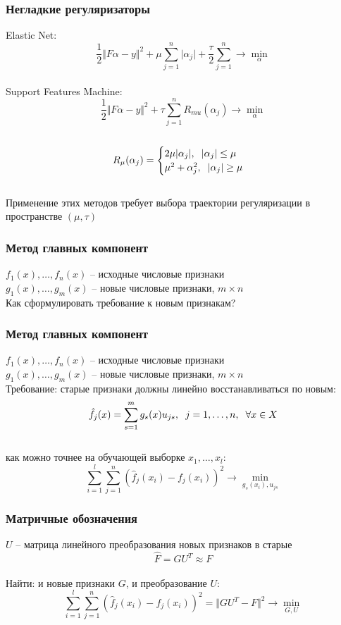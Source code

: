 \documentclass[12pt]{beamer}
\begin{document}
\begin{frame}\frametitle{Негладкие регуляризаторы}
Elastic Net:\\
$$\frac{1}{2} \Vert F\alpha - y \Vert^2 + \mu \sum\limits_{j=1}^n \vert \alpha_j \vert + \frac{\tau}{2} \sum\limits_{j=1}^n \rightarrow \min\limits_{\alpha}$$\\
Support Features Machine:\\
$$\frac{1}{2} \Vert F\alpha - y \Vert^2 + \tau \sum\limits_{j=1}^n R_{mu}(\alpha_j) \rightarrow \min\limits_{\alpha}$$\\
$$ R_{\mu}(\alpha_j) = \begin{cases} 2 \mu \vert \alpha_j \vert, \hspace{2mm} \vert \alpha_j \vert \leq \mu\\
\mu^2 + \alpha_j^2, \hspace{2mm} \vert \alpha_j \vert \geq \mu
\end{cases}$$\\
Применение этих методов требует выбора траектории регуляризации в пространстве $(\mu, \tau )$
\end{frame}

\begin{frame}\frametitle{Метод главных компонент}
$f_1(x), \dots, f_n(x)$ -- исходные числовые признаки\\
$g_1(x), \dots, g_m(x)$ -- новые числовые признаки, $m \times n$\\
Как сформулировать требование к новым признакам?
\end{frame}


\begin{frame}\frametitle{Метод главных компонент}
$f_1(x), \dots, f_n(x)$ -- исходные числовые признаки\\
$g_1(x), \dots, g_m(x)$ -- новые числовые признаки, $m \times n$\\
Требование: старые признаки должны линейно
восстанавливаться по новым:\\
$$\hat{f}_j(x) = \sum\limits_{s=1}^m g_s(x) u_{js} , \hspace{2mm} j = 1,\dots , n, \hspace{2mm} \forall x \in X$$\\
как можно точнее на обучающей выборке $x_1, \dots, x_l$:\\
$$\sum\limits_{i=1}^l \sum\limits_{j=1}^n (\hat{f}_j(x_i) - f_j(x_i))^2 \rightarrow \min\limits_{g_s(x_i), u_{js}}$$
\end{frame}

\begin{frame}\frametitle{Матричные обозначения}
$U$ -- матрица линейного преобразования новых признаков в старые\\
$$\hat{F} = GU^T \approx F$$\\
Найти: и новые признаки $G$, и преобразование $U$:\\
$$\sum\limits_{i=1}^l \sum\limits_{j=1}^n (\hat{f}_j(x_i) - f_j(x_i))^2 = \Vert GU^T - F \Vert^2 \rightarrow \min\limits_{G, U}$$
\end{frame}
\end{document}
